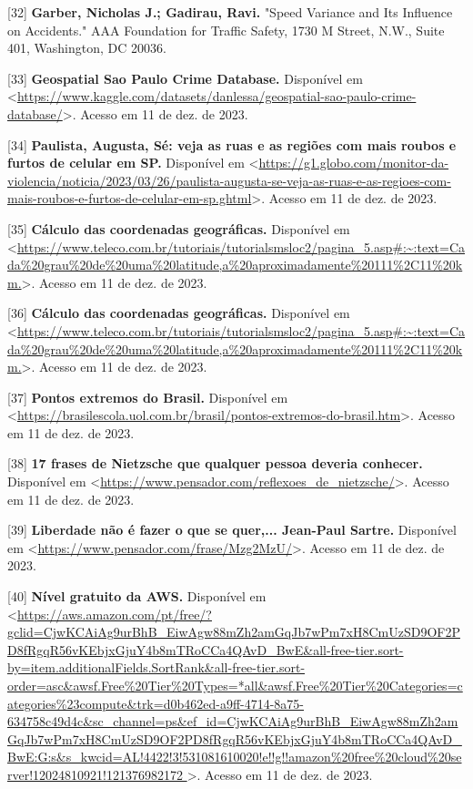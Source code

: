 [32] \textbf{Garber, Nicholas J.; Gadirau, Ravi.} "Speed Variance and Its Influence on Accidents." AAA Foundation for Traffic Safety, 1730 M Street, N.W., Suite 401, Washington, DC 20036.

[33] \textbf{Geospatial Sao Paulo Crime Database.} Disponível em <\url{https://www.kaggle.com/datasets/danlessa/geospatial-sao-paulo-crime-database/}>. Acesso em 11 de dez. de 2023.

[34] \textbf{Paulista, Augusta, Sé: veja as ruas e as regiões com mais roubos e furtos de celular em SP.} Disponível em <\url{https://g1.globo.com/monitor-da-violencia/noticia/2023/03/26/paulista-augusta-se-veja-as-ruas-e-as-regioes-com-mais-roubos-e-furtos-de-celular-em-sp.ghtml}>. Acesso em 11 de dez. de 2023.

[35] \textbf{Cálculo das coordenadas geográficas.} Disponível em <\url{https://www.teleco.com.br/tutoriais/tutorialsmsloc2/pagina_5.asp#:~:text=Cada%20grau%20de%20uma%20latitude,a%20aproximadamente%20111%2C11%20km.}>. Acesso em 11 de dez. de 2023.


[36] \textbf{Cálculo das coordenadas geográficas.} Disponível em <\url{https://www.teleco.com.br/tutoriais/tutorialsmsloc2/pagina_5.asp#:~:text=Cada%20grau%20de%20uma%20latitude,a%20aproximadamente%20111%2C11%20km.}>. Acesso em 11 de dez. de 2023.


[37] \textbf{Pontos extremos do Brasil.} Disponível em <\url{https://brasilescola.uol.com.br/brasil/pontos-extremos-do-brasil.htm}>. Acesso em 11 de dez. de 2023.

[38] \textbf{17 frases de Nietzsche que qualquer pessoa deveria conhecer.} Disponível em <\url{https://www.pensador.com/reflexoes_de_nietzsche/}>. Acesso em 11 de dez. de 2023.


[39] \textbf{Liberdade não é fazer o que se quer,... Jean-Paul Sartre.} Disponível em <\url{https://www.pensador.com/frase/Mzg2MzU/}>. Acesso em 11 de dez. de 2023.


[40] \textbf{Nível gratuito da AWS.} Disponível em <\url{https://aws.amazon.com/pt/free/?gclid=CjwKCAiAg9urBhB_EiwAgw88mZh2amGqJb7wPm7xH8CmUzSD9OF2PD8fRgqR56vKEbjxGjuY4b8mTRoCCa4QAvD_BwE&all-free-tier.sort-by=item.additionalFields.SortRank&all-free-tier.sort-order=asc&awsf.Free%
}>. Acesso em 11 de dez. de 2023.

